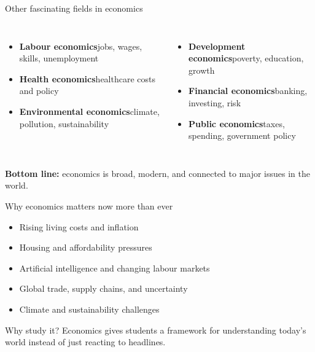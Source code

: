 \documentclass[aspectratio=169,11pt]{beamer}
\begin{document}
\begin{frame}{Other fascinating fields in economics}
\begin{columns}[T,totalwidth=\textwidth]
\begin{itemize}
    \item \textbf{Labour economics}\newline jobs, wages, skills, unemployment
    \item \textbf{Health economics}\newline healthcare costs and policy
    \item \textbf{Environmental economics}\newline climate, pollution, sustainability
\end{itemize}
\begin{itemize}
    \item \textbf{Development economics}\newline poverty, education, growth
    \item \textbf{Financial economics}\newline banking, investing, risk
    \item \textbf{Public economics}\newline taxes, spending, government policy
\end{itemize}
\end{columns}
\vspace{0.4cm}
\textbf{Bottom line:} economics is broad, modern, and connected to major issues in the world.
\end{frame}

\begin{frame}{Why economics matters now more than ever}
\begin{itemize}
    \item Rising living costs and inflation
    \item Housing and affordability pressures
    \item Artificial intelligence and changing labour markets
    \item Global trade, supply chains, and uncertainty
    \item Climate and sustainability challenges
\end{itemize}
\vspace{0.4cm}
\begin{block}{Why study it?}
Economics gives students a framework for understanding today's world instead of just reacting to headlines.
\end{block}
\end{frame}
\end{document}
